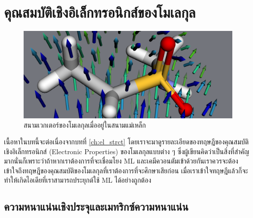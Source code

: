 

\chapter{คุณสมบัติเชิงอิเล็กทรอนิกส์ของโมเลกุล}
\label{ch:el_prop}

\begin{figure}[H]
    \centering
    \includegraphics[width=0.6\linewidth]{fig/mol_properties.png}
    \caption{สนามเวกเตอร์ของโมเลกุลเมื่ออยู่ในสนามแม่เหล็ก}
    \label{fig:mol_prop}
\end{figure}

เนื้อหาในบทนี้จะต่อเนื่องจากบทที่ \ref{ch:el_strct} โดยเราจะมาดูรายละเอียดของทฤษฎีของคุณสมบัติเชิงอิเล็กทรอนิกส์ (Electronic Properties) ของโมเลกุลแบบต่าง ๆ ซึ่งผู้เขียนคิดว่าเป็นสิ่งที่สำคัญมากนั่นก็เพราะว่าถ้าหากเราต้องการที่จะเชื่อมโยง ML และเคมีควอนตัมเข้าด้วยกันเราควรจะต้องเข้าใจถึงทฤษฎีของคุณสมบัติของโมเลกุลที่เราต้องการที่จะศึกษาเสียก่อน เมื่อเราเข้าใจทฤษฎีแล้วก็จะทำให้เกิดไอเดียที่เราสามารถประยุกต์ใช้ ML ได้อย่างถูกต้อง

\section{ความหนาแน่นเชิงประจุและเมทริกซ์ความหนาแน่น}
\label{sec:charge_den}

